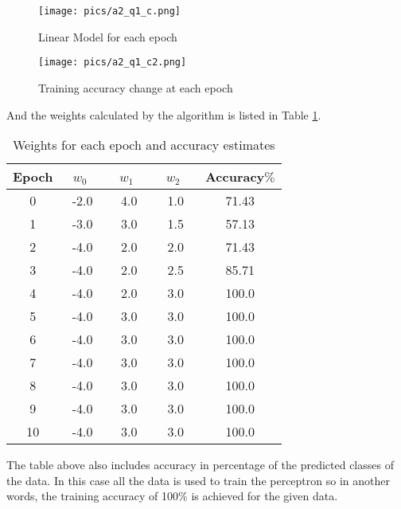 \documentclass[11pt]{article}
\begin{document}
\begin{multicols}{2}

\begin{figure}[H]
\centering
\texttt{[image: pics/a2\_q1\_c.png]}
\captionsetup{justification=centering}
\caption{Linear Model for each epoch}
\label{fig:q1c}
\end{figure}

\begin{figure}[H]
\centering
\texttt{[image: pics/a2\_q1\_c2.png]}
\captionsetup{justification=centering}
\caption{Training accuracy change at each epoch}
\label{fig:q1c2}
\end{figure}

\end{multicols}

And the weights calculated by the algorithm is listed in Table \ref{q1weights}. 

\bgroup
\def\arraystretch{1.5}%
\begin{table}[H]
\centering
\caption{Weights for each epoch and accuracy estimates}
\begin{tabular}{|c|c|c|c|c|}
\hline
\textbf{Epoch}   & \ $w_0$ \  & \ $w_1$ \ & \ $w_2$ \ & \textbf{Accuracy$\%$} \\ \hline
0 &-2.0 &4.0 &1.0 & 71.43 \\ \hline
1 &-3.0 &3.0 &1.5 & 57.13 \\ \hline
2 &-4.0 &2.0 &2.0 & 71.43 \\ \hline
3 &-4.0 &2.0 &2.5 & 85.71 \\ \hline
4 &-4.0 &2.0 &3.0 & 100.0\\ \hline
5 &-4.0 &3.0 &3.0 & 100.0\\ \hline
6 &-4.0 &3.0 &3.0 & 100.0\\ \hline
7 &-4.0 &3.0 &3.0 & 100.0\\ \hline
8 &-4.0 &3.0 &3.0 & 100.0\\ \hline
9 &-4.0 &3.0 &3.0 & 100.0\\ \hline
10&-4.0 &3.0 &3.0 & 100.0\\ \hline
\end{tabular}
\label{q1weights}
\end{table}
\egroup

The table above also includes accuracy in percentage of the predicted classes of the data. In this case all the data is used to train the perceptron so in another words, the training accuracy of 100$\%$ is achieved for the given data. \medskip
\end{document}
